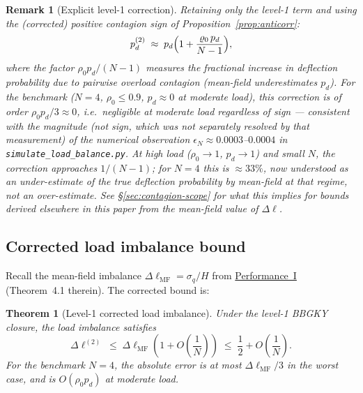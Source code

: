 \documentclass[11pt,a4paper]{article}
\newtheorem{theorem}{Theorem}[section]
\newtheorem{remark}{Remark}[section]
\newcommand{\pd}{p_d}
\begin{document}
\begin{remark}[Explicit level-1 correction]
Retaining only the level-1 term and using the (corrected) positive
contagion sign of Proposition~\ref{prop:anticorr}:
\begin{equation}
  \pd^{(2)}
  \;\approx\; \pd\Bigl(1 + \frac{\rho_0\,\pd}{N-1}\Bigr),
  \label{eq:pd-level1}
\end{equation}
where the factor $\rho_0\pd/(N-1)$ measures the fractional \emph{increase}
in deflection probability due to pairwise overload contagion (mean-field
underestimates $\pd$). For the benchmark ($N=4$, $\rho_0 \leq 0.9$,
$\pd \approx 0$ at moderate load), this correction is of order
$\rho_0\pd/3 \approx 0$, i.e.\ negligible at moderate load regardless of
sign --- consistent with the magnitude (not sign, which was not
separately resolved by that measurement) of the numerical observation
$\epsilon_N \approx 0.0003$--$0.0004$ in
\texttt{simulate\_load\_balance.py}.
At high load ($\rho_0 \to 1$, $\pd \to 1$) and small $N$,
the correction approaches $1/(N-1)$; for $N=4$ this is $\approx 33\%$,
now understood as an \emph{under}-estimate of the true deflection
probability by mean-field at that regime, not an over-estimate. See
\S\ref{sec:contagion-scope} for what this implies for bounds derived
elsewhere in this paper from the mean-field value of $\Delta\ell$.
\end{remark}

\subsection{Corrected load imbalance bound}

Recall the mean-field imbalance $\Delta\ell_{\mathrm{MF}} = \sigma_q/H$
from \hyperref[chap:load_balance]{Performance~I} (Theorem~4.1 therein).
The corrected bound is:

\begin{theorem}[Level-1 corrected load imbalance]
\label{thm:corrected-imbalance}
Under the level-1 BBGKY closure, the load imbalance satisfies
\begin{equation}
  \Delta\ell^{(2)}
  \;\leq\; \Delta\ell_{\mathrm{MF}}\!
  \left(1 + O\!\left(\frac{1}{N}\right)\right)
  \;\leq\; \frac{1}{2} + O\!\left(\frac{1}{N}\right).
\end{equation}
For the benchmark $N = 4$, the absolute error is at most
$\Delta\ell_{\mathrm{MF}} / 3$ in the worst case, and is
$O(\rho_0\pd)$ at moderate load.
\end{theorem}
\end{document}
